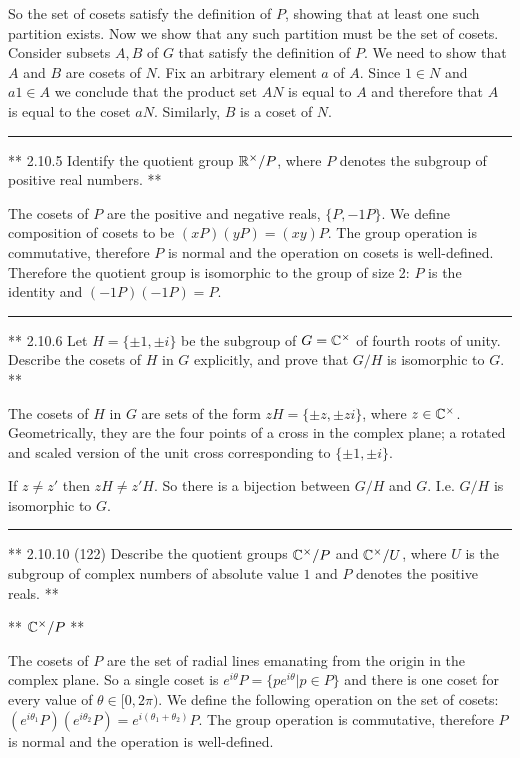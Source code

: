 So the set of cosets satisfy the definition of $P$, showing that at least one
such partition exists. Now we show that any such partition must be the set of
cosets. Consider subsets $A, B$ of $G$ that satisfy the definition of $P$. We
need to show that $A$ and $B$ are cosets of $N$. Fix an arbitrary element $a$
of $A$. Since $1 \in N$ and $a1 \in A$ we conclude that the product set $AN$ is
equal to $A$ and therefore that $A$ is equal to the coset $aN$. Similarly, $B$
is a coset of $N$.

\hrule

** 2.10.5 Identify the quotient group $\mathbb{R}^\times/P$, where $P$ denotes the subgroup of
positive real numbers. **

The cosets of $P$ are the positive and negative reals, $\{P, -1P\}$. We define
composition of cosets to be $(xP)(yP) = (xy)P$. The group operation is
commutative, therefore $P$ is normal and the operation on cosets is
well-defined. Therefore the quotient group is isomorphic to the group of size
2: $P$ is the identity and $(-1P)(-1P) = P$.

\hrule

** 2.10.6 Let $H = \{±1, ±i\}$ be the subgroup of $G = \mathbb{C}^\times$ of fourth roots
of unity. Describe the cosets of $H$ in $G$ explicitly, and prove that $G/H$ is
isomorphic to $G$. **

The cosets of $H$ in $G$ are sets of the form $zH = \{±z, ±zi\}$, where $z \in
\mathbb{C}^\times$. Geometrically, they are the four points of a cross in the complex
plane; a rotated and scaled version of the unit cross corresponding to $\{±1,
±i\}$.

If $z \neq z'$ then $zH \neq z'H$. So there is a bijection between $G/H$ and
$G$. I.e. $G/H$ is isomorphic to $G$.

\hrule

** 2.10.10 (122) Describe the quotient groups $\mathbb{C}^\times / P$ and $\mathbb{C}^\times /
U$, where $U$ is the subgroup of complex numbers of absolute value $1$ and $P$
denotes the positive reals. **

** $\mathbb{C}^\times / P$ **

The cosets of $P$ are the set of radial lines emanating from the origin in the
complex plane. So a single coset is $e^{i\theta}P = \{pe^{i\theta} | p \in P\}$
and there is one coset for every value of $\theta \in [0, 2\pi)$. We define the
following operation on the set of cosets:
$(e^{i\theta_1}P)(e^{i\theta_2}P) = e^{i(\theta_1 + \theta_2)}P$. The group operation is commutative, therefore $P$ is normal and the operation is well-defined.

